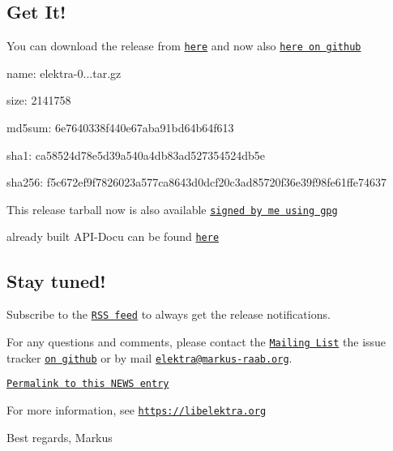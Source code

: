 \subsection*{Get It!}

You can download the release from \href{https://www.libelektra.org/ftp/elektra/releases/elektra-0.8.13.tar.gz}{\tt here} and now also \href{https://github.com/ElektraInitiative/ftp/tree/master/releases/elektra-0.8.13.tar.gz}{\tt here on github}


\begin{DoxyItemize}
\item name\+: elektra-\/0...\+tar.\+gz
\item size\+: 2141758
\item md5sum\+: 6e7640338f440e67aba91bd64b64f613
\item sha1\+: ca58524d78e5d39a540a4db83ad527354524db5e
\item sha256\+: f5c672ef9f7826023a577ca8643d0dcf20c3ad85720f36e39f98fe61ffe74637
\end{DoxyItemize}

This release tarball now is also available \href{https://www.libelektra.org/ftp/elektra/releases/elektra-0.8.13.tar.gz.gpg}{\tt signed by me using gpg}

already built A\+P\+I-\/\+Docu can be found \href{https://doc.libelektra.org/api/0.8.13/html/}{\tt here}

\subsection*{Stay tuned!}

Subscribe to the \href{https://doc.libelektra.org/news/feed.rss}{\tt R\+SS feed} to always get the release notifications.

For any questions and comments, please contact the \href{https://lists.sourceforge.net/lists/listinfo/registry-list}{\tt Mailing List} the issue tracker \href{https://git.libelektra.org/issues}{\tt on github} or by mail \href{mailto:elektra@markus-raab.org}{\tt elektra@markus-\/raab.\+org}.

\href{https://doc.libelektra.org/news/3c00a5f1-c017-4555-92b5-a2cf6e0803e3.html}{\tt Permalink to this N\+E\+WS entry}

For more information, see \href{https://libelektra.org}{\tt https\+://libelektra.\+org}

Best regards, Markus 